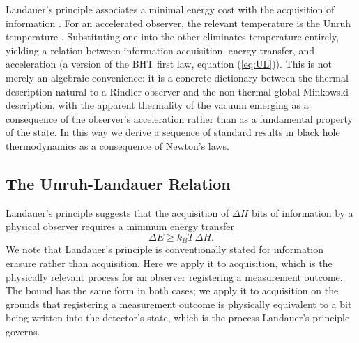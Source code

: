 \documentclass[12pt,a4paper]{article}
\begin{document}
Landauer's principle associates a minimal energy cost with the acquisition of information \cite{landauer1961irreversibility}. For an accelerated observer, the relevant temperature is the Unruh temperature \cite{unruh1976notes}. Substituting one into the other eliminates temperature entirely, yielding a relation between information acquisition, energy transfer, and acceleration (a version of the BHT first law, equation (\ref{eq:UL})). This is not merely an algebraic convenience: it is a concrete dictionary between the thermal description natural to a Rindler observer and the non-thermal global Minkowski description, with the apparent thermality of the vacuum emerging as a consequence of the observer's acceleration rather than as a fundamental property of the state. In this way we derive a sequence of standard results in black hole thermodynamics as a consequence of Newton's laws.

\subsection{The Unruh-Landauer Relation}


Landauer's principle suggests that the acquisition of $\Delta H$ bits of information by a physical observer requires a minimum energy transfer
\begin{equation}
  \Delta E \geq k_B T \, \Delta H.
\end{equation}
We note that Landauer's principle is conventionally stated for information erasure rather than acquisition. Here we apply it to acquisition, which is the physically relevant process for an observer registering a measurement outcome. The bound has the same form in both cases; we apply it to acquisition on the grounds that registering a measurement outcome is physically equivalent to a bit being written into the detector's state, which is the process Landauer's principle governs.
\end{document}
